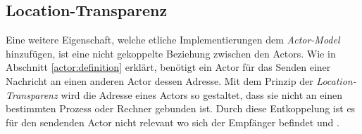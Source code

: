 \subsection{Location-Transparenz}\label{actor:locationTransparency}
Eine weitere Eigenschaft, welche etliche Implementierungen dem \textit{Actor-Model} hinzufügen, ist eine nicht gekoppelte Beziehung zwischen den Actors. Wie in Abschnitt \ref{actor:definition} erklärt, benötigt ein Actor für das Senden einer Nachricht an einen anderen Actor dessen Adresse. Mit dem Prinzip der \textit{Location-Transparenz} wird die Adresse eines Actors so gestaltet, dass sie nicht an einen bestimmten Prozess oder Rechner gebunden ist. Durch diese Entkoppelung ist es für den sendenden Actor nicht relevant wo sich der Empfänger befindet \citep{Vernon2015ReactiveAkka} und \citep{sargent2016play}.

